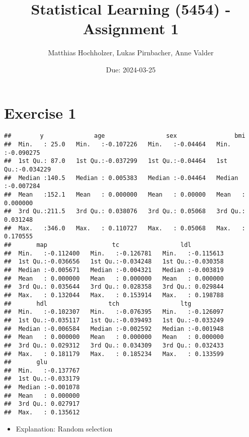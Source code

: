 \documentclass[
]{article}
\title{Statistical Learning (5454) - Assignment 1}
\author{Matthias Hochholzer, Lukas Pirnbacher, Anne Valder}
\date{Due: 2024-03-25}
\providecommand{\tightlist}{%
  \setlength{\itemsep}{0pt}\setlength{\parskip}{0pt}}
\begin{document}
\maketitle

\hypertarget{exercise-1}{%
\section{Exercise 1}\label{exercise-1}}

\begin{verbatim}
##        y              age                 sex                bmi           
##  Min.   : 25.0   Min.   :-0.107226   Min.   :-0.04464   Min.   :-0.090275  
##  1st Qu.: 87.0   1st Qu.:-0.037299   1st Qu.:-0.04464   1st Qu.:-0.034229  
##  Median :140.5   Median : 0.005383   Median :-0.04464   Median :-0.007284  
##  Mean   :152.1   Mean   : 0.000000   Mean   : 0.00000   Mean   : 0.000000  
##  3rd Qu.:211.5   3rd Qu.: 0.038076   3rd Qu.: 0.05068   3rd Qu.: 0.031248  
##  Max.   :346.0   Max.   : 0.110727   Max.   : 0.05068   Max.   : 0.170555  
##       map                  tc                 ldl           
##  Min.   :-0.112400   Min.   :-0.126781   Min.   :-0.115613  
##  1st Qu.:-0.036656   1st Qu.:-0.034248   1st Qu.:-0.030358  
##  Median :-0.005671   Median :-0.004321   Median :-0.003819  
##  Mean   : 0.000000   Mean   : 0.000000   Mean   : 0.000000  
##  3rd Qu.: 0.035644   3rd Qu.: 0.028358   3rd Qu.: 0.029844  
##  Max.   : 0.132044   Max.   : 0.153914   Max.   : 0.198788  
##       hdl                 tch                 ltg           
##  Min.   :-0.102307   Min.   :-0.076395   Min.   :-0.126097  
##  1st Qu.:-0.035117   1st Qu.:-0.039493   1st Qu.:-0.033249  
##  Median :-0.006584   Median :-0.002592   Median :-0.001948  
##  Mean   : 0.000000   Mean   : 0.000000   Mean   : 0.000000  
##  3rd Qu.: 0.029312   3rd Qu.: 0.034309   3rd Qu.: 0.032433  
##  Max.   : 0.181179   Max.   : 0.185234   Max.   : 0.133599  
##       glu           
##  Min.   :-0.137767  
##  1st Qu.:-0.033179  
##  Median :-0.001078  
##  Mean   : 0.000000  
##  3rd Qu.: 0.027917  
##  Max.   : 0.135612
\end{verbatim}

\begin{itemize}
\tightlist
\item
  Explanation: Random selection
\end{itemize}
\end{document}
